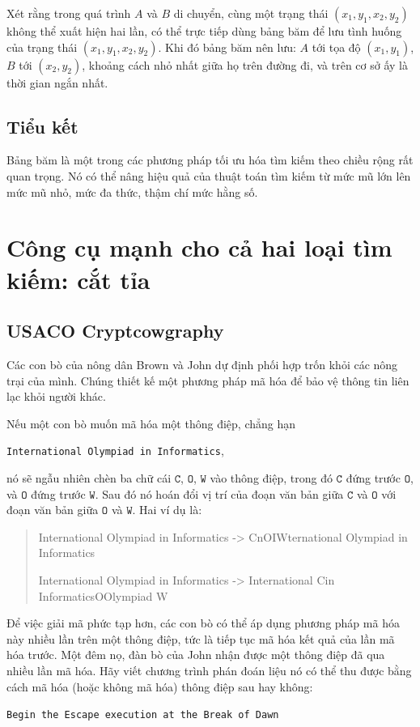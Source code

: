 \documentclass[11pt]{article}
\begin{document}
Xét rằng trong quá trình \(A\) và \(B\) di chuyển, cùng một trạng thái
\((x_1,y_1,x_2,y_2)\) không thể xuất hiện hai lần, có thể trực tiếp dùng bảng
băm để lưu tình huống của trạng thái \((x_1,y_1,x_2,y_2)\). Khi đó bảng băm
nên lưu: \(A\) tới tọa độ \((x_1,y_1)\), \(B\) tới \((x_2,y_2)\), khoảng cách
nhỏ nhất giữa họ trên đường đi, và trên cơ sở ấy là thời gian ngắn nhất.

\subsection{Tiểu kết}

Bảng băm là một trong các phương pháp tối ưu hóa tìm kiếm theo chiều rộng rất
quan trọng. Nó có thể nâng hiệu quả của thuật toán tìm kiếm từ mức mũ lớn lên
mức mũ nhỏ, mức đa thức, thậm chí mức hằng số.

\section{Công cụ mạnh cho cả hai loại tìm kiếm: cắt tỉa}

\subsection{USACO Cryptcowgraphy}

Các con bò của nông dân Brown và John dự định phối hợp trốn khỏi các nông
trại của mình. Chúng thiết kế một phương pháp mã hóa để bảo vệ thông tin liên
lạc khỏi người khác.

Nếu một con bò muốn mã hóa một thông điệp, chẳng hạn
\begin{center}
\texttt{International Olympiad in Informatics},
\end{center}
nó sẽ ngẫu nhiên chèn ba chữ cái \(\texttt{C}\), \(\texttt{O}\),
\(\texttt{W}\) vào thông điệp, trong đó \(\texttt{C}\) đứng trước
\(\texttt{O}\), và \(\texttt{O}\) đứng trước \(\texttt{W}\). Sau đó nó hoán
đổi vị trí của đoạn văn bản giữa \(\texttt{C}\) và \(\texttt{O}\) với đoạn
văn bản giữa \(\texttt{O}\) và \(\texttt{W}\). Hai ví dụ là:
\begin{quote}\scriptsize\ttfamily
International Olympiad in Informatics -> CnOIWternational Olympiad in Informatics

International Olympiad in Informatics -> International Cin InformaticsOOlympiad W
\end{quote}

Để việc giải mã phức tạp hơn, các con bò có thể áp dụng phương pháp mã hóa
này nhiều lần trên một thông điệp, tức là tiếp tục mã hóa kết quả của lần mã
hóa trước. Một đêm nọ, đàn bò của John nhận được một thông điệp đã qua nhiều
lần mã hóa. Hãy viết chương trình phán đoán liệu nó có thể thu được bằng cách
mã hóa (hoặc không mã hóa) thông điệp sau hay không:
\begin{center}
\texttt{Begin the Escape execution at the Break of Dawn}
\end{center}
\end{document}
